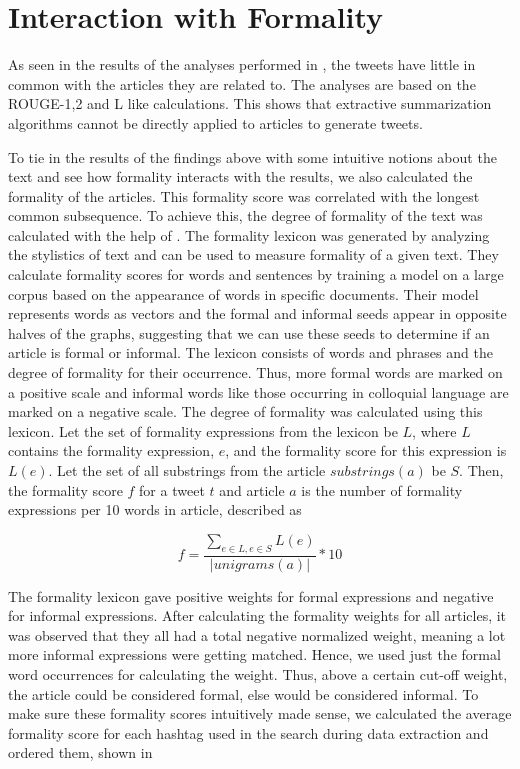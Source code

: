 \section{Interaction with Formality}

As seen in the results of the analyses performed in , the tweets have little in common with the articles they are related to. The analyses are based on the ROUGE-1,2 and L like calculations. This shows that extractive summarization algorithms cannot be directly applied to articles to generate tweets. 

To tie in the results of the findings above with some intuitive notions about the text and see how formality interacts with the results, we also calculated the formality of the articles. This formality score was correlated with the longest common subsequence. To achieve this, the degree of formality of the text was calculated with the help of . The formality lexicon was generated by analyzing the stylistics of text and can be used to measure formality of a given text. They calculate formality scores for words and sentences by training a model on a large corpus based on the appearance of words in specific documents. Their model represents words as vectors and the formal and informal seeds appear in opposite halves of the graphs, suggesting that we can use these seeds to determine if an article is formal or informal. The lexicon consists of words and phrases and the degree of formality for their occurrence. Thus, more formal words are marked on a positive scale and informal words like those occurring in colloquial language are marked on a negative scale. The degree of formality was calculated using this lexicon. Let the set of formality expressions from the lexicon be $L$, where $L$ contains the formality expression, $e$, and the formality score for this expression is $L(e)$. Let the set of all substrings from the article $\textit{substrings}(a)$ be $S$. Then, the formality score $f$ for a tweet $t$ and article $a$ is the number of formality expressions per 10 words in article, described as  

\begin{equation}
f = \frac{\sum\limits_{e \in L, e \in S} L(e)}{| unigrams(a) |} * 10
\end{equation}

The formality lexicon gave positive weights for formal expressions and negative for informal expressions. After calculating the formality weights for all articles, it was observed that they all had a total negative normalized weight, meaning a lot more informal expressions were getting matched. Hence, we used just the formal word occurrences for calculating the weight. Thus, above a certain cut-off weight, the article could be considered formal, else would be considered informal. To make sure these formality scores intuitively made sense, we calculated the average formality score for each hashtag used in the search during data extraction and ordered them, shown in 


